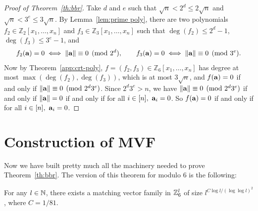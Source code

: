 \begin{proof}[Proof of Theorem~\ref{th:bbr}]
  Take $d$ and $e$ such that $\sqrt{n} < 2^d \leq 2\sqrt{n}$ and $\sqrt{n} < 3^e \leq 3\sqrt{n}$. By Lemma~\ref{lem:prime poly}, there are two polynomials $f_2 \in \mathbb{Z}_2[x_1, \ldots, x_n]$ and $f_3 \in \mathbb{Z}_3[x_1, \ldots, x_n]$ such that $\deg(f_2) \leq 2^d - 1$, $\deg(f_3) \leq 3^e - 1$, and
\[
f_2(\mathbf{a}) = 0 \iff \|\mathbf{a}\| \equiv 0 \pmod{2^d}, \qquad f_3(\mathbf{a}) = 0 \iff \|\mathbf{a}\| \equiv 0 \pmod{3^e}.
\]
Now by Theorem~\ref{app:crt-poly}, $f = (f_2, f_3) \in \mathbb{Z}_6[x_1, \ldots, x_n]$ has degree at most $\max(\deg(f_2), \deg(f_3))$, which is at most $3\sqrt{n}$, and $f(\mathbf{a}) = 0$ if and only if $\|\mathbf{a}\| \equiv 0 \pmod{2^d 3^e}$. Since $2^d 3^e > n$, we have $\|\mathbf{a}\| \equiv 0 \pmod{2^d 3^e}$ if and only if $\|\mathbf{a}\| = 0$ if and only if for all $ i \in [n],\ \bfa_i = 0$. So $f(\mathbf{a}) = 0$ if and only if for all $ i \in [n],\ \bfa_i = 0$.
\end{proof}

\section{Construction of MVF}

Now we have built pretty much all the machinery needed to prove Theorem~\ref{th:bbr}. The version of this theorem for modulo $6$ is the following:
\begin{blackbox}
    \begin{theorem}\label{th:baby-bbr}
        For any $l\in\mathbb{N}$, there exists a matching vector family in $\mathbb{Z}_6^l$ of size $l^{C\log l/(\log\log l)^2}$, where $C = 1/81$.   
    \end{theorem}
\end{blackbox}

